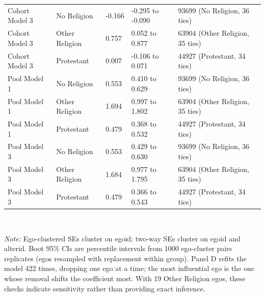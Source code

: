 \begin{table}[htbp]
\begin{tabular}{lllll}
Cohort Model 3 & No Religion & -0.166 & -0.295 to -0.090 & 93699 (No Religion, 36 ties) \\
Cohort Model 3 & Other Religion & 0.757 & 0.052 to 0.877 & 63904 (Other Religion, 35 ties) \\
Cohort Model 3 & Protestant & 0.007 & -0.106 to 0.071 & 44927 (Protestant, 34 ties) \\
Pool Model 1 & No Religion & 0.553 & 0.410 to 0.629 & 93699 (No Religion, 36 ties) \\
Pool Model 1 & Other Religion & 1.694 & 0.997 to 1.802 & 63904 (Other Religion, 35 ties) \\
Pool Model 1 & Protestant & 0.479 & 0.368 to 0.532 & 44927 (Protestant, 34 ties) \\
Pool Model 3 & No Religion & 0.553 & 0.429 to 0.630 & 93699 (No Religion, 36 ties) \\
Pool Model 3 & Other Religion & 1.684 & 0.977 to 1.795 & 63904 (Other Religion, 35 ties) \\
Pool Model 3 & Protestant & 0.479 & 0.366 to 0.543 & 44927 (Protestant, 34 ties) \\
\bottomrule
\end{tabular}
\\[4pt]
\begin{minipage}{0.95\textwidth}\footnotesize \textit{Note:} Ego-clustered SEs cluster on egoid; two-way SEs cluster on egoid and alterid. Boot 95\% CIs are percentile intervals from 1000 ego-cluster pairs replicates (egos resampled with replacement within group). Panel D refits the model 422 times, dropping one ego at a time; the most influential ego is the one whose removal shifts the coefficient most. With 19 Other Religion egos, these checks indicate sensitivity rather than providing exact inference.\end{minipage}
\end{table}
